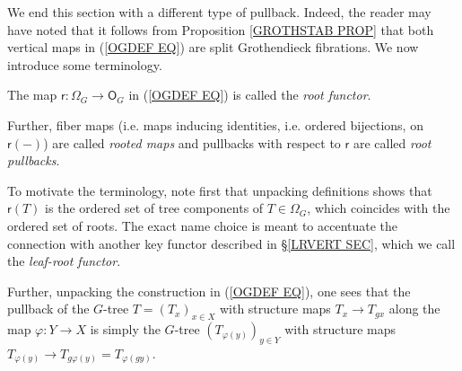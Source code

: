 \documentclass[a4paper,10pt]{article}%
\begin{document}

We end this section with a different type of pullback.
Indeed, the reader may have noted
that it follows from 
Proposition \ref{GROTHSTAB PROP}
that both vertical maps in (\ref{OGDEF EQ})
are split Grothendieck fibrations. We now introduce some terminology.

\begin{definition}\label{ROOTPULL DEF}
The map $\mathsf{r} \colon \Omega_G \to \mathsf{O}_G$
in (\ref{OGDEF EQ}) is called the \textit{root functor}.

Further, fiber maps (i.e. maps inducing identities, i.e. ordered bijections, on $\mathsf{r}(\minus)$) are called \textit{rooted maps} and pullbacks with respect to $\mathsf{r}$ are called
\textit{root pullbacks}.
\end{definition}

To motivate the terminology, 
note first that unpacking definitions shows that 
$\mathsf{r}(T)$ is the ordered set of tree components of  
$T\in \Omega_G$,
which coincides with the ordered set of roots.
The exact name choice is meant to accentuate the connection with another key functor
described in \S \ref{LRVERT SEC},
which we call the \textit{leaf-root functor}.

Further, unpacking the construction in (\ref{OGDEF EQ}), one sees that the pullback of the $G$-tree
$T = (T_x)_{x \in X}$ with structure maps $T_x \to T_{g x}$
along the map 
$\varphi \colon Y \to X$
is simply the $G$-tree
$(T_{\varphi(y)})_{y \in Y}$
with structure maps 
$T_{\varphi(y)} \to T_{g \varphi(y)} = T_{\varphi(g y)}$.
\end{document}
